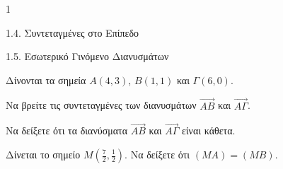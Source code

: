 \begin{ylh}{1}
    \item 1.4. Συντεταγμένες στο Επίπεδο
    \item 1.5. Εσωτερικό Γινόμενο Διανυσμάτων
\end{ylh}
Δίνονται τα σημεία $A(4,3)$, $B(1,1)$ και $\Gamma(6,0)$.
\begin{alist}
\item Να βρείτε τις συντεταγμένες των διανυσμάτων $\vec{AB}$ και $\vec{A\Gamma}$. 
\item Να δείξετε ότι τα διανύσματα $\vec{AB}$ και $\vec{A\Gamma}$ είναι κάθετα. 
\item Δίνεται το σημείο $M\left(\frac{7}{2}, \frac{1}{2}\right)$. Να δείξετε ότι $(MA)=(MB)$. 
\end{alist}